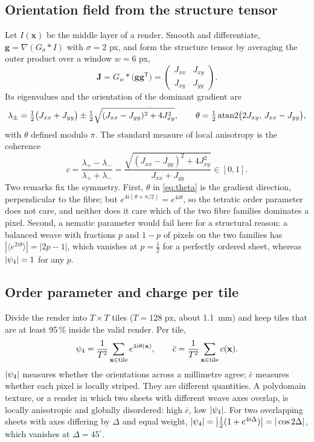 \subsection{Orientation field from the structure tensor}
Let $I(\mathbf{x})$ be the middle layer of a render. Smooth and differentiate, $\mathbf{g}=\nabla(G_{\sigma}*I)$ with $\sigma=2$ px, and form the structure tensor by averaging the outer product over a window $w=6$ px,
\begin{equation}
\mathbf{J}=G_{w}*\bigl(\mathbf{g}\mathbf{g}^{\mathsf T}\bigr)=
\begin{pmatrix}J_{xx}&J_{xy}\\ J_{xy}&J_{yy}\end{pmatrix}.
\label{eq:J}
\end{equation}
Its eigenvalues and the orientation of the dominant gradient are
\begin{equation}
\lambda_{\pm}=\tfrac12\bigl(J_{xx}+J_{yy}\bigr)\pm\tfrac12\sqrt{(J_{xx}-J_{yy})^{2}+4J_{xy}^{2}},
\qquad
\theta=\tfrac12\operatorname{atan2}\bigl(2J_{xy},\,J_{xx}-J_{yy}\bigr),
\label{eq:theta}
\end{equation}
with $\theta$ defined modulo $\pi$. The standard measure of local anisotropy is the coherence
\begin{equation}
c=\frac{\lambda_{+}-\lambda_{-}}{\lambda_{+}+\lambda_{-}}
=\frac{\sqrt{(J_{xx}-J_{yy})^{2}+4J_{xy}^{2}}}{J_{xx}+J_{yy}}\in[0,1].
\label{eq:coherence}
\end{equation}
Two remarks fix the symmetry. First, $\theta$ in \cref{eq:theta} is the gradient direction, perpendicular to the fibre; but $e^{4i(\theta+\pi/2)}=e^{4i\theta}$, so the tetratic order parameter does not care, and neither does it care which of the two fibre families dominates a pixel. Second, a nematic parameter would fail here for a structural reason: a balanced weave with fractions $p$ and $1-p$ of pixels on the two families has $|\langle e^{2i\theta}\rangle|=|2p-1|$, which vanishes at $p=\tfrac12$ for a perfectly ordered sheet, whereas $|\psi_4|=1$ for any $p$.

\subsection{Order parameter and charge per tile}
Divide the render into $T\times T$ tiles ($T=128$ px, about \SI{1.1}{mm}) and keep tiles that are at least 95\,\% inside the valid render. Per tile,
\begin{equation}
\psi_4=\frac{1}{T^{2}}\sum_{\mathbf{x}\in\text{tile}}e^{4i\theta(\mathbf{x})},\qquad
\bar c=\frac{1}{T^{2}}\sum_{\mathbf{x}\in\text{tile}}c(\mathbf{x}).
\end{equation}
$|\psi_4|$ measures whether the orientations across a millimetre agree; $\bar c$ measures whether each pixel is locally striped. They are different quantities. A polydomain texture, or a render in which two sheets with different weave axes overlap, is locally anisotropic and globally disordered: high $\bar c$, low $|\psi_4|$. For two overlapping sheets with axes differing by $\Delta$ and equal weight, $|\psi_4|=\bigl|\tfrac12(1+e^{4i\Delta})\bigr|=|\cos2\Delta|$, which vanishes at $\Delta=45^{\circ}$.

